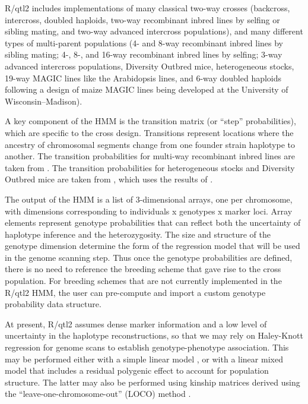 \documentclass[12pt,letterpaper]{article}
\begin{document}
R/qtl2 includes implementations of many classical two-way crosses
(backcross, intercross, doubled haploids, two-way recombinant inbred
lines by selfing or sibling mating, and two-way advanced intercross
populations), and many different types of multi-parent populations
(4- and 8-way recombinant inbred lines by sibling mating; 4-, 8-, and
16-way recombinant inbred lines by selfing; 3-way advanced intercross
populations, Diversity Outbred mice, heterogeneous stocks, 19-way MAGIC
lines like the \citet{kover2009} Arabidopsis lines, and 6-way doubled
haploids following a design of maize MAGIC lines being developed at
the University of Wisconsin--Madison).

A key component of the HMM is the transition matrix (or ``step''
probabilities), which are specific to the cross design.
Transitions represent locations where the ancestry of chromosomal segments
change from one founder strain haplotype to another.
The transition probabilities
for multi-way recombinant inbred lines are taken from
\citet{broman2005}. The transition probabilities for heterogeneous
stocks and Diversity Outbred mice are taken from \citet{broman2012b}, which
uses the results of \citet{broman2012a}.

The output of the HMM is a list of 3-dimensional arrays, one per chromosome, with
dimensions corresponding to individuals x genotypes x marker loci.
Array elements represent genotype probabilities that can reflect both the uncertainty of
haplotype inference and the heterozygosity.
The size and structure of the genotype dimension determine the
form of the regression model that will be used in the genome scanning step.
Thus once the genotype probabilities are defined, there is no need to reference
the breeding scheme that gave rise to the cross population.
For breeding schemes that are not currently implemented in the R/qtl2 HMM,
the user can pre-compute and import a custom genotype probability data structure.

At present, R/qtl2 assumes dense marker information and a low level of
uncertainty in the haplotype reconstructions, so that we may rely on
Haley-Knott regression \citep{haley1992} for genome scans to establish
genotype-phenotype association. This may be performed either with a
simple linear model \citep[as in][]{haley1992}, or with a linear mixed
model \citep{yu2006, kang2008, lippert2011} that includes a residual
polygenic effect to account for population structure. The latter may
also be performed using kinship matrices derived using the
``leave-one-chromosome-out'' (LOCO) method \citep[see][]{yang2014}.
\end{document}
